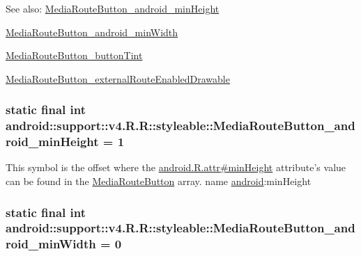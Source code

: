 \begin{Desc}
\item[See also:]\hyperlink{classandroid_1_1support_1_1v4_1_1_r_1_1styleable_232cbfb4c13b07cb6d29fd924cdb6b61}{MediaRouteButton\_\-android\_\-minHeight} 

\hyperlink{classandroid_1_1support_1_1v4_1_1_r_1_1styleable_00278b194a19a6476c38e50dde31642c}{MediaRouteButton\_\-android\_\-minWidth} 

\hyperlink{classandroid_1_1support_1_1v4_1_1_r_1_1styleable_c0211c76c5d560a47ec498d31003f0b6}{MediaRouteButton\_\-buttonTint} 

\hyperlink{classandroid_1_1support_1_1v4_1_1_r_1_1styleable_8ae8e1423dabf0e93738248e95b25fd8}{MediaRouteButton\_\-externalRouteEnabledDrawable} \end{Desc}
\hypertarget{classandroid_1_1support_1_1v4_1_1_r_1_1styleable_232cbfb4c13b07cb6d29fd924cdb6b61}{
\subsubsection[{MediaRouteButton\_\-android\_\-minHeight}]{\setlength{\rightskip}{0pt plus 5cm}static final int android::support::v4.R.R::styleable::MediaRouteButton\_\-android\_\-minHeight = 1}}
\label{classandroid_1_1support_1_1v4_1_1_r_1_1styleable_232cbfb4c13b07cb6d29fd924cdb6b61}


This symbol is the offset where the \hyperlink{}{android.R.attr\#minHeight} attribute's value can be found in the \hyperlink{classandroid_1_1support_1_1v4_1_1_r_1_1styleable_b8373fc29d9d3ae7c46174f3caf39215}{MediaRouteButton} array.  name \hyperlink{namespaceandroid}{android}:minHeight \hypertarget{classandroid_1_1support_1_1v4_1_1_r_1_1styleable_00278b194a19a6476c38e50dde31642c}{
\subsubsection[{MediaRouteButton\_\-android\_\-minWidth}]{\setlength{\rightskip}{0pt plus 5cm}static final int android::support::v4.R.R::styleable::MediaRouteButton\_\-android\_\-minWidth = 0}}
\label{classandroid_1_1support_1_1v4_1_1_r_1_1styleable_00278b194a19a6476c38e50dde31642c}


